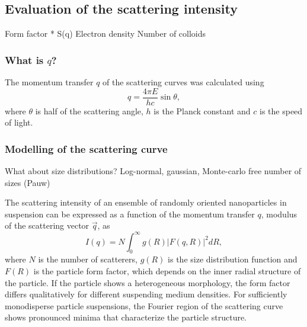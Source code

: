 \subsection{Evaluation of the scattering intensity}
Form factor * S(q)
Electron density
Number of colloids
\subsubsection{What is $q$?}
The momentum transfer \(q\) of the scattering curves was calculated using
\begin{equation}
q=\frac{4\pi E}{hc}\sin\theta ,
\end{equation}
where \(\theta\) is half of the scattering angle, \(h\) is the Planck constant and \(c\) is the speed of light.

\subsubsection{Modelling of the scattering curve}
What about size distributions? Log-normal, gaussian, Monte-carlo free number of sizes (Pauw)

The scattering intensity of an ensemble of randomly oriented nanoparticles in suspension can be expressed as a function of the momentum transfer \( q \), modulus of the scattering vector \(\vec q\), as
\begin{equation}
\label{eq:intensity}
I(q)=N\int_{0}^{\infty} g(R)\left|F(q,R) \right|^2 dR,
\end{equation}
where \(N\) is the number of scatterers, \(g(R)\) is the size distribution function and \(F(R)\) is the particle form factor, which depends on the inner radial structure of the particle. If the particle shows a heterogeneous morphology, the form factor differs qualitatively for different suspending medium densities.  For sufficiently monodisperse particle suspensions, the Fourier region of the scattering curve shows pronounced minima that characterize the particle structure. 

